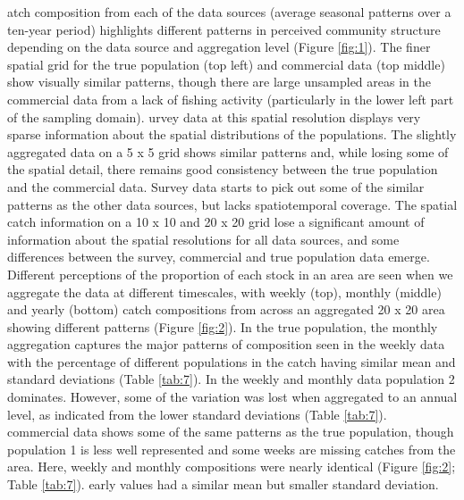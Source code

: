 \documentclass[review]{elsarticle}
\begin{document}
atch composition  from each of the data sources (average seasonal patterns over a ten-year period) highlights
different patterns in perceived community structure depending on the data
source and aggregation level (Figure \ref{fig:1}). The finer spatial grid for
the true population (top left) and commercial data (top middle) show visually
similar patterns, though there are large unsampled areas in the commercial data
from a lack of fishing activity (particularly in the lower left part of the
sampling domain). urvey data at this spatial resolution displays very
sparse information about the spatial distributions of the populations. The
slightly aggregated data on a 5 x 5 grid shows similar patterns and, while
losing some of the spatial detail, there remains good consistency between the
true population and the commercial data. Survey data starts to pick out some of
the similar patterns as the other data sources, but lacks spatiotemporal
coverage. The spatial catch information on a 10 x 10 and 20 x 20 grid lose a
significant amount of information about the spatial resolutions for all data
sources, and some differences between the survey, commercial and true
population data emerge. \\

Different perceptions of the proportion of each stock in an area are seen when
we aggregate the data at different timescales, with weekly (top), monthly
(middle) and yearly (bottom) catch compositions from across an aggregated 20 x
20 area showing different patterns (Figure \ref{fig:2}). In the true
population, the monthly aggregation captures the major patterns of composition
seen in the weekly data with the percentage of different populations in the
catch having similar mean and standard deviations (Table \ref{tab:7}). In the
weekly and monthly data population 2 dominates. However, some of the variation
was lost when aggregated to an annual level, as indicated from the lower
standard deviations (Table \ref{tab:7}).\\

 commercial data shows some of the same patterns as the
true population, though population 1  is less well
represented and some weeks are missing catches from the area. Here, weekly and
monthly compositions were nearly identical (Figure \ref{fig:2}; Table
\ref{tab:7}). early values had a similar mean but
smaller standard deviation.\\
\end{document}
